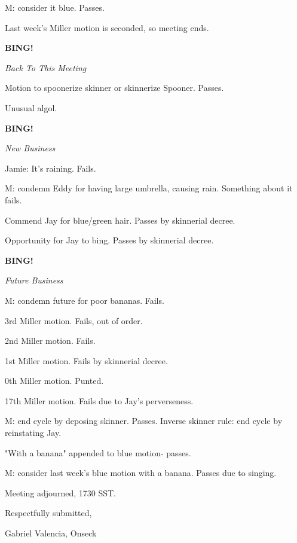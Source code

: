 \documentclass[12pt]{article}
\newcommand{\bing}{{\bf BING!} }
\newcommand{\goto}[1]{\bing \vskip 12pt \centerline{{\em{#1}}}}
\begin{document}
M: consider it blue. Passes.

Last week's Miller motion is seconded, so meeting ends.

\goto{Back To This Meeting}

Motion to spoonerize skinner or skinnerize Spooner. Passes.

Unusual algol.

\goto{New Business}

Jamie: It's raining. Fails.

M: condemn Eddy for having large umbrella, causing rain. Something about it fails.

Commend Jay for blue/green hair. Passes by skinnerial decree.

Opportunity for Jay to bing. Passes by skinnerial decree.

\goto{Future Business}

M: condemn future for poor bananas. Fails.

3rd Miller motion. Fails, out of order.

2nd Miller motion. Fails.

1st Miller motion. Fails by skinnerial decree.

0th Miller motion. Punted.

17th Miller motion. Fails due to Jay's perverseness.

M: end cycle by deposing skinner. Passes. Inverse skinner rule: end cycle by reinstating Jay.

"With a banana" appended to blue motion- passes.

M: consider last week's blue motion with a banana. Passes due to singing.

\vspace{12pt}

\noindent
Meeting adjourned, 1730 SST.

\vspace{18pt}

\centerline{Respectfully submitted,}
\centerline{Gabriel Valencia, Onseck}
\end{document}

